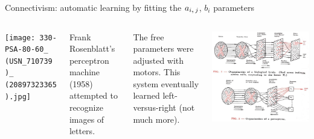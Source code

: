 \documentclass[aspectratio=169]{beamer}
\begin{document}
\begin{frame}{Connectivism: automatic learning by fitting the $a_{i\mbox{,\,}j}$, $b_i$ parameters}
\small
\vspace{0.2 cm}
\begin{columns}
\texttt{[image: 330-PSA-80-60\_\\(USN\_710739\\)\_\\(20897323365\\).jpg]}

Frank Rosenblatt's perceptron machine (1958) attempted to recognize images of letters.

\vspace{0.2 cm}
\begin{minipage}{1.1\linewidth}\raggedright
The free parameters were adjusted with motors. This system eventually learned left-versus-right (not much more).
\end{minipage}

\includegraphics[width=\linewidth]{Organization_of_a_biological_brain_and_a_perceptron.png}
\end{columns}
\end{frame}
\end{document}

